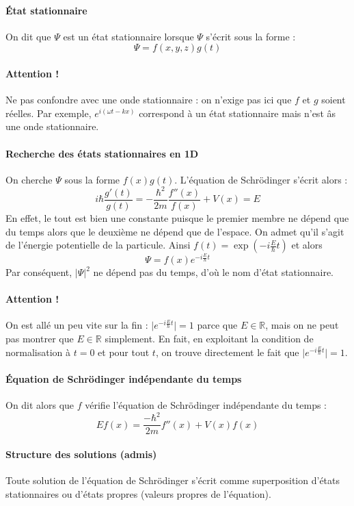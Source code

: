 \documentclass[french]{book}
\theoremstyle{plain}
\theoremstyle{definition}
\theoremstyle{remark}
\newcommand{\R}{\mathbb{R}}
\begin{document}
\paragraph{État stationnaire} On dit que $\Psi$ est un état stationnaire lorsque $\Psi$ s'écrit sous la forme :$$\Psi=f(x,y,z)g(t)$$
\paragraph{Attention !} Ne pas confondre avec une onde stationnaire : on n'exige pas ici que $f$ et $g$ soient réelles. Par exemple, $e^{i(\omega t-kx)}$ correspond à un état stationnaire mais n'est âs une onde stationnaire.
\paragraph{Recherche des états stationnaires en 1D} On cherche $\Psi$ sous la forme $f(x)g(t)$. L'équation de Schrödinger s'écrit alors : $$i\hbar \frac{g'(t)}{g(t)}=-\frac{\hbar^2}{2m}\frac{f''(x)}{f(x)}+V(x)=E$$ En effet, le tout est bien une constante puisque le premier membre ne dépend que du temps alors que le deuxième ne dépend que de l'espace. On admet qu'il s'agit de l'énergie potentielle de la particule. Ainsi $f(t)=\exp\left(-i\displaystyle\frac{E}{\hbar}t\right)$ et alors $$\Psi=f(x)e^{\displaystyle-i\frac{E}{\hbar}t}$$ Par conséquent, $\lvert\Psi\rvert^2$ ne dépend pas du temps, d'où le nom d'état stationnaire.
\paragraph{Attention !} On est allé un peu vite sur la fin : $\lvert e^{\displaystyle-i\frac{E}{\hbar}t}\rvert=1$ parce que $E\in\R$, mais on ne peut pas montrer que $E\in\R$ simplement. En fait, en exploitant la condition de normalisation à $t=0$ et pour tout $t$, on trouve directement le fait que $\lvert e^{\displaystyle-i\frac{E}{\hbar}t}\rvert=1$.
\paragraph{Équation de Schrödinger indépendante du temps} On dit alors que $f$ vérifie l'équation de Schrödinger indépendante du temps : $$Ef(x)=\frac{-\hbar^2}{2m}f''(x)+V(x)f(x)$$
\paragraph{Structure des solutions (admis)} Toute solution de l'équation de Schrödinger s'écrit comme superposition d'états stationnaires ou d'états propres (valeurs propres de l'équation).
\end{document}
